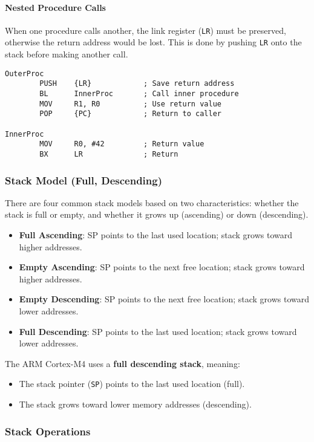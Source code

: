 \paragraph{Nested Procedure Calls}

When one procedure calls another, the link register (\texttt{LR}) must be preserved, otherwise the return address would be lost. This is done by pushing \texttt{LR} onto the stack before making another call.

\begin{lstlisting}[caption={Nested procedure example}]
OuterProc
        PUSH    {LR}            ; Save return address
        BL      InnerProc       ; Call inner procedure
        MOV     R1, R0          ; Use return value
        POP     {PC}            ; Return to caller

InnerProc 
        MOV     R0, #42         ; Return value
        BX      LR              ; Return
\end{lstlisting}


\subsubsection{Stack Model (Full, Descending)}
There are four common stack models based on two characteristics: whether the stack is full or empty, and whether it grows up (ascending) or down (descending). 
\begin{itemize}[nosep]
    \item \textbf{Full Ascending}: SP points to the last used location; stack grows toward higher addresses.
    \item \textbf{Empty Ascending}: SP points to the next free location; stack grows toward higher addresses.
    \item \textbf{Empty Descending}: SP points to the next free location; stack grows toward lower addresses.
    \item \textbf{Full Descending}: SP points to the last used location; stack grows toward lower addresses.
\end{itemize}
The ARM Cortex-M4 uses a \textbf{full descending stack}, meaning:
\begin{itemize}[nosep]
    \item The stack pointer (\texttt{SP}) points to the last used location (full).
    \item The stack grows toward lower memory addresses (descending).
\end{itemize}
\subsubsection{Stack Operations}

